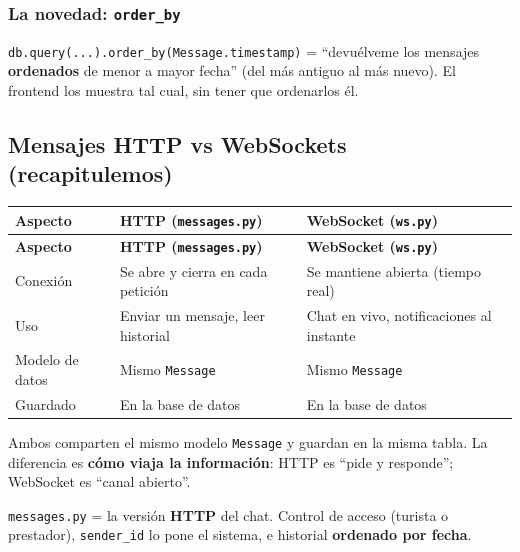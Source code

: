 \documentclass[11pt,a4paper]{article}
\begin{document}
\subsubsection{La novedad: \texttt{order\_by}}

\texttt{db.query(...).order\_by(Message.timestamp)} = ``devuélveme los mensajes \textbf{ordenados}
de menor a mayor fecha'' (del más antiguo al más nuevo). El frontend los muestra tal cual,
sin tener que ordenarlos él.

\subsection{Mensajes HTTP vs WebSockets (recapitulemos)}

\begin{center}
{\small
\setlength{\tabcolsep}{4pt}
\begin{longtable}{@{}>{\raggedright\arraybackslash}p{4cm}>{\raggedright\arraybackslash}p{5.5cm}>{\raggedright\arraybackslash}p{5.4cm}@{}}
\toprule
\textbf{Aspecto} & \textbf{HTTP (\texttt{messages.py})} & \textbf{WebSocket (\texttt{ws.py})} \\
\midrule
\endfirsthead
\toprule
\textbf{Aspecto} & \textbf{HTTP (\texttt{messages.py})} & \textbf{WebSocket (\texttt{ws.py})} \\
\midrule
\endhead
Conexión & Se abre y cierra en cada petición & Se mantiene abierta (tiempo real) \\
Uso & Enviar un mensaje, leer historial & Chat en vivo, notificaciones al instante \\
Modelo de datos & Mismo \texttt{Message} & Mismo \texttt{Message} \\
Guardado & En la base de datos & En la base de datos \\
\bottomrule
\end{longtable}
}
\end{center}

Ambos comparten el mismo modelo \texttt{Message} y guardan en la misma tabla. La diferencia es
\textbf{cómo viaja la información}: HTTP es ``pide y responde''; WebSocket es ``canal abierto''.

\begin{recuadro}
\texttt{messages.py} = la versión \textbf{HTTP} del chat. Control de acceso (turista o prestador),
\texttt{sender\_id} lo pone el sistema, e historial \textbf{ordenado por fecha}.
\end{recuadro}

\end{document}
